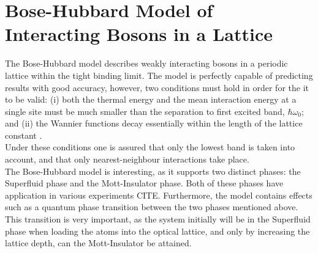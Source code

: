 \chapter{Bose-Hubbard Model of Interacting Bosons in a Lattice}
The Bose-Hubbard model describes weakly interacting bosons in a periodic lattice within the tight binding limit. The model is perfectly capable of predicting results with good accuracy, however, two conditions must hold in order for the it to be valid: (i) both the thermal energy and the mean interaction energy at a single site must be much smaller than the separation to first excited band, $\hbar \omega_0$; and (ii) the Wannier functions decay essentially within the length of the lattice constant \cite{manybodyBloch}.\\
Under these conditions one is assured that only the lowest band is taken into account, and that only nearest-neighbour interactions take place.\\
The Bose-Hubbard model is interesting, as it supports two distinct phases: the Superfluid phase and the Mott-Insulator phase. Both of these phases have application in various experiments CITE. Furthermore, the model contains effects such as a quantum phase transition between the two phases mentioned above. This transition is very important, as the system initially will be in the Superfluid phase when loading the atoms into the optical lattice, and only by increasing the lattice depth, can the Mott-Insulator be attained. 


